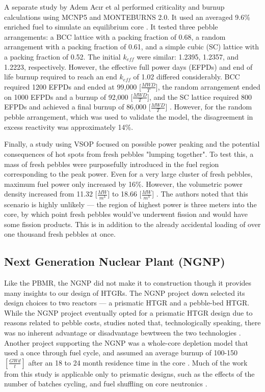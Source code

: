 A separate study by Adem Acır et al performed criticality and burnup calculations using MCNP5 and MONTEBURNS 2.0.  It used an averaged 9.6\% enriched fuel to simulate an equilibrium core \cite{noauthor_criticality_2011}.  It tested three pebble arrangements:  a BCC lattice with a packing fraction of 0.68, a random arrangement with a packing fraction of 0.61, and a simple cubic (SC) lattice with a packing fraction of 0.52.  The initial $k_{eff}$ were similar: 1.2395, 1.2357, and 1.2223, respectively.  However, the effective full power days (EFPDs) and end of life burnup required to reach an end $k_{eff}$  of 1.02 differed considerably.  BCC required 1200 EFPDs and ended at 99,000 [$\frac{MWD}{T}$], the random arrangement ended on 1000 EFPDs and a burnup of 92,000 [$\frac{MWD}{T}$], and the SC lattice required 800 EFPDs and achieved a final burnup of 86,000 [$\frac{MWD}{T}$] \cite{noauthor_criticality_2011}.  However, for the random pebble arrangement, which was used to validate the model, the disagreement in excess reactivity was approximately 14\%.

Finally, a study using VSOP focused on possible power peaking and the potential consequences of hot spots \cite{reitsma_investigation_2005} from fresh pebbles "lumping together".  To test this, a mass of fresh pebbles were purposefully introduced in the fuel region corresponding to the peak power.  Even for a very large cluster of fresh pebbles, maximum fuel power only increased by 16\%.  However, the volumetric power density increased from 11.32 [$\frac{MW}{m^3}$] to 18.66 [$\frac{MW}{m^3}$] \cite{reitsma_investigation_2005}.  The authors noted that this scenario is highly unlikely --- the region of highest power is three meters into the core, by which point fresh pebbles would've underwent fission and would have some fission products.  This is in addition to the already accidental loading of over one thousand fresh pebbles at once.

\subsection{Next Generation Nuclear Plant (NGNP)}

Like the PBMR, the NGNP did not make it to construction though it provides many insights to our design of HTGRs.  The NGNP project down selected its design choices to two reactors --- a prismatic HTGR and a pebble-bed HTGR.  While the NGNP project eventually opted for a prismatic HTGR design \cite{noauthor_areva_nodate} due to reasons related to pebble costs, studies noted that, technologically speaking, there was no inherent advantage or disadvantage bewtween the two technologies \cite{inl_basis_2011}.  Another project supporting the NGNP was a whole-core depletion model that used a once through fuel cycle, and assumed an average burnup of 100-150 $\left[\frac{GWd}{t}\right]$ after an 18 to 24 month residence time in the core \cite{tkkim_whole-core_nodate}.  Much of the work from this study is applicable only to prismatic designs, such as the effects of the number of batches cycling, and fuel shuffling on core neutronics \cite{tkkim_whole-core_nodate}.



